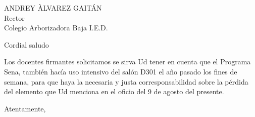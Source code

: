 \documentclass[letterpaper,spanish]{letter}
\date{1 de septiembre de 2017}
\begin{document}
\begin{letter}{ANDREY ÀLVAREZ GAITÁN\\Rector\\Colegio Arborizadora Baja I.E.D.}
	
\opening{Cordial saludo}
Los docentes firmantes solicitamos se sirva Ud tener en cuenta que el Programa Sena, también hacía uso intensivo del salón D301 el año pasado los fines de semana, para que haya la necesaria y justa corresponsabilidad sobre la pérdida del elemento que Ud menciona en el oficio del 9 de agosto del presente.

\closing{Atentamente,}


\end{letter}
\end{document}
